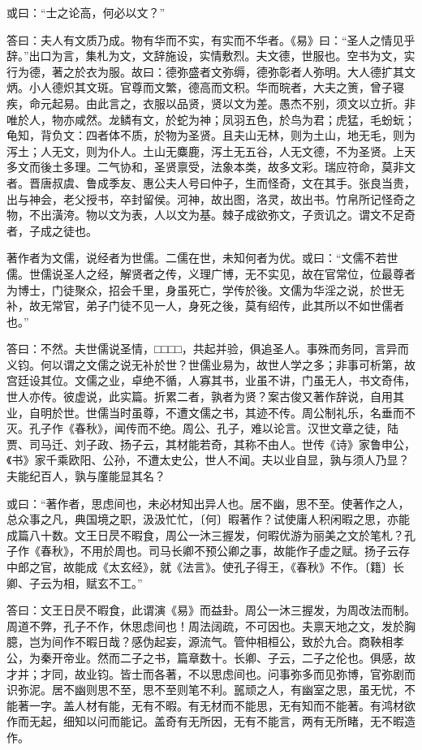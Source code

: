 \documentclass[]{article}
\begin{document}
或曰：``士之论高，何必以文？''

答曰：夫人有文质乃成。物有华而不实，有实而不华者。《易》曰：``圣人之情见乎辞。''出口为言，集札为文，文辞施设，实情敷烈。夫文德，世服也。空书为文，实行为德，著之於衣为服。故曰：德弥盛者文弥缛，德弥彰者人弥明。大人德扩其文炳。小人德炽其文斑。官尊而文繁，德高而文积。华而晥者，大夫之箦，曾子寝疾，命元起易。由此言之，衣服以品贤，贤以文为差。愚杰不别，须文以立折。非唯於人，物亦咸然。龙鳞有文，於蛇为神；凤羽五色，於鸟为君；虎猛，毛蚡蚖；龟知，背负文：四者体不质，於物为圣贤。且夫山无林，则为土山，地无毛，则为泻土；人无文，则为仆人。土山无麋鹿，泻土无五谷，人无文德，不为圣贤。上天多文而後土多理。二气协和，圣贤禀受，法象本类，故多文彩。瑞应符命，莫非文者。晋唐叔虞、鲁成季友、惠公夫人号曰仲子，生而怪奇，文在其手。张良当贵，出与神会，老父授书，卒封留侯。河神，故出图，洛灵，故出书。竹帛所记怪奇之物，不出潢洿。物以文为表，人以文为基。棘子成欲弥文，子贡讥之。谓文不足奇者，子成之徒也。

著作者为文儒，说经者为世儒。二儒在世，未知何者为优。或曰：``文儒不若世儒。世儒说圣人之经，解贤者之传，义理广博，无不实见，故在官常位，位最尊者为博士，门徒聚众，招会千里，身虽死亡，学传於後。文儒为华淫之说，於世无补，故无常官，弟子门徒不见一人，身死之後，莫有绍传，此其所以不如世儒者也。''

答曰：不然。夫世儒说圣情，□□□□，共起并验，俱追圣人。事殊而务同，言异而义钧。何以谓之文儒之说无补於世？世儒业易为，故世人学之多；非事可析第，故宫廷设其位。文儒之业，卓绝不循，人寡其书，业虽不讲，门虽无人，书文奇伟，世人亦传。彼虚说，此实篇。折累二者，孰者为贤？案古俊又著作辞说，自用其业，自明於世。世儒当时虽尊，不遭文儒之书，其迹不传。周公制礼乐，名垂而不灭。孔子作《春秋》，闻传而不绝。周公、孔子，难以论言。汉世文章之徒，陆贾、司马迁、刘子政、扬子云，其材能若奇，其称不由人。世传《诗》家鲁申公，《书》家千乘欧阳、公孙，不遭太史公，世人不闻。夫以业自显，孰与须人乃显？夫能纪百人，孰与廑能显其名？

或曰：``著作者，思虑间也，未必材知出异人也。居不幽，思不至。使著作之人，总众事之凡，典国境之职，汲汲忙忙，〔何〕暇著作？试使庸人积闲暇之思，亦能成篇八十数。文王日昃不暇食，周公一沐三握发，何暇优游为丽美之文於笔札？孔子作《春秋》，不用於周也。司马长卿不预公卿之事，故能作子虚之赋。扬子云存中郎之官，故能成《太玄经》，就《法言》。使孔子得王，《春秋》不作。〔籍〕长卿、子云为相，赋玄不工。''

答曰：文王日昃不暇食，此谓演《易》而益卦。周公一沐三握发，为周改法而制。周道不弊，孔子不作，休思虑间也！周法阔疏，不可因也。夫禀天地之文，发於胸臆，岂为间作不暇日哉？感伪起妄，源流气。管仲相桓公，致於九合。商鞅相孝公，为秦开帝业。然而二子之书，篇章数十。长卿、子云，二子之伦也。俱感，故才并；才同，故业钧。皆士而各著，不以思虑间也。问事弥多而见弥博，官弥剧而识弥泥。居不幽则思不至，思不至则笔不利。嚚顽之人，有幽室之思，虽无忧，不能著一字。盖人材有能，无有不暇。有无材而不能思，无有知而不能著。有鸿材欲作而无起，细知以问而能记。盖奇有无所因，无有不能言，两有无所睹，无不暇造作。
\end{document}
